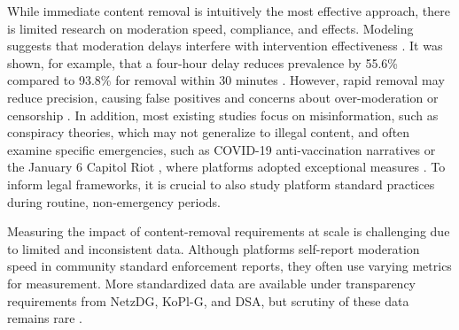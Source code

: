\documentclass{article}
\begin{document}
While immediate content removal is intuitively the most effective approach, there is limited research on moderation speed, compliance, and effects.   
Modeling suggests that moderation delays interfere with intervention effectiveness \cite{schneider2023effectiveness}. 
It was shown, for example, that a four-hour delay reduces prevalence by 55.6\% compared to 93.8\% for removal within 30 minutes \cite{bak2022combining}.
However, 
rapid removal may reduce precision, causing false positives and concerns about over-moderation or censorship \cite{chancellor2017multimodal, jhaver2019human, jiang2023trade}. 
In addition, most existing studies focus on misinformation, such as conspiracy theories, which may not generalize to illegal content, and often examine specific emergencies, such as COVID-19 anti-vaccination narratives \cite{broniatowski2022evaluating} or the January 6 Capitol Riot \cite{goldstein2023understanding}, where platforms adopted exceptional measures \cite{Science_eLetter_2024}. 
To inform legal frameworks, it is crucial to also study platform standard practices during routine, non-emergency periods.

Measuring the impact of content-removal requirements at scale is challenging due to limited and inconsistent data. Although platforms self-report moderation speed in community standard enforcement reports, they often use varying metrics for measurement. More standardized data are available under transparency requirements from NetzDG, KoPl-G, and DSA, but scrutiny of these data remains rare \cite{kaushal2024automated}. 
\end{document}
